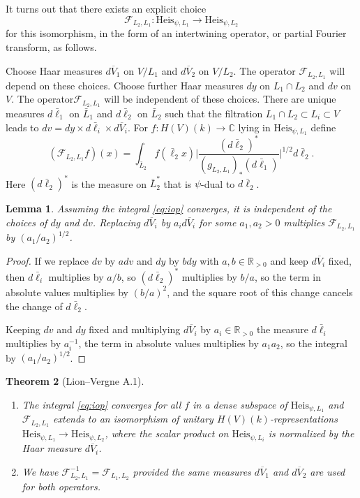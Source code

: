 \documentclass{article}
\def\mc#1{\mathcal{#1}}
\def\tx#1{\textrm{#1}}
\def\R{\mathbb{R}}
\def\C{\mathbb{C}}
\def\ol#1{\overline{#1}}
\newtheorem{thm}{Theorem}[subsection]
\newtheorem{lem}[thm]{Lemma}
\theoremstyle{definition}
\numberwithin{equation}{subsection}
\renewcommand{\-}{\hyp{}}
\begin{document}
\begin{appendices}
It turns out that there exists an explicit choice 
\[ \mc{F}_{L_2,L_1} : \tx{Heis}_{\psi,L_1} \to \tx{Heis}_{\psi,L_2} \]
for this isomorphism, in the form of an intertwining operator, or partial Fourier transform, as follows.

Choose Haar measures $d\ol{V}_1$ on $V/L_1$ and $d\ol{V}_2$ on $V/L_2$. The operator $\mc{F}_{L_2,L_1}$ will depend on these choices. Choose further Haar measures $dy$ on $L_1 \cap L_2$ and $dv$ on $V$. The operator$\mc{F}_{L_2,L_1}$ will be independent of these choices. There are unique measures $d\bar \ell_1$ on $\bar L_1$ and $d\bar\ell_2$ on $\bar L_2$ such that the filtration $L_1 \cap L_2 \subset L_i \subset V$ leads to $dv = dy \times d\bar\ell_i \times d\ol{V}_i$. For $f : H(V)(k) \to \C$ lying in $\tx{Heis}_{\psi,L_1}$ define
\begin{equation} \label{eq:iop}
	(\mc{F}_{L_2,L_1}f)(x) = \int_{\bar L_2}f(\bar\ell_2 x)\Big|\frac{(d\bar\ell_2)^*}{(g_{L_2,L_1})_*(d\bar\ell_1)}\Big|^{1/2}d\bar\ell_2.
\end{equation}
Here $(d\bar\ell_2)^*$ is the measure on $\bar L_2^*$ that is $\psi$-dual to $d\bar\ell_2$.

\begin{lem}
	Assuming the integral \eqref{eq:iop} converges, it is independent of the choices of $dy$ and $dv$. Replacing $d\ol{V}_i$ by $a_id\ol{V}_i$ for some $a_1,a_2>0$ multiplies $\mc{F}_{L_2,L_1}$ by $(a_1/a_2)^{1/2}$.
\end{lem}
\begin{proof}
	If we replace $dv$ by $adv$ and $dy$ by $bdy$ with $a,b \in \R_{>0}$ and keep $d\ol{V}_i$ fixed, then $d\bar \ell_i$ multiplies by $a/b$, so $(d\bar\ell_2)^*$ multiplies by $b/a$, so the term in absolute values multiplies by $(b/a)^2$, and the square root of this change cancels the change of $d\bar\ell_2$.

	Keeping $dv$ and $dy$ fixed and multiplying $d\ol{V}_i$ by $a_i \in \R_{>0}$ the measure $d\bar\ell_i$ multiplies by $a_i^{-1}$, the term in absolute values multiplies by $a_1a_2$, so the integral by $(a_1/a_2)^{1/2}$. 
\end{proof}

\begin{thm}[Lion--Vergne A.1]
	\begin{enumerate}
		\item The integral \eqref{eq:iop} converges for all $f$ in a dense subspace of $\mathrm{Heis}_{\psi,L_1}$ and $\mc{F}_{L_2,L_1}$ extends to an isomorphism of unitary $H(V)(k)$-representations $\mathrm{Heis}_{\psi,L_1} \to \mathrm{Heis}_{\psi,L_2}$, where the scalar product on $\mathrm{Heis}_{\psi,L_i}$ is normalized by the Haar measure $d\ol{V}_i$.
		\item We have $\mc{F}_{L_2,L_1}^{-1}=\mc{F}_{L_1,L_2}$ provided the same measures $d\ol{V}_1$ and $d\ol{V}_2$ are used for both operators. 
	\end{enumerate}
\end{thm}


\end{appendices}
\end{document}
